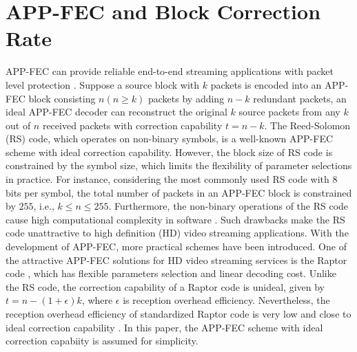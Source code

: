 \documentclass[journal]{IEEEtran}
\begin{document}
\section{APP-FEC and Block Correction Rate}
APP-FEC can provide reliable end-to-end streaming applications with packet level protection \cite{LuSW08}. Suppose a source block with $k$ packets is encoded into an APP-FEC block consisting $n \left(n\geq k\right)$ packets by adding $n-k$ redundant packets, an ideal APP-FEC decoder can reconstruct the original $k$ source packets from any $k$ out of $n$ received packets \cite{LuSW08} with correction capability $t=n-k$. The Reed-Solomon (RS) code, which operates on non-binary symbols, is a well-known APP-FEC scheme with ideal correction capability. However, the block size of RS code is constrained by the symbol size, which limits the flexibility of parameter selections in practice. For instance, considering the most commonly used RS code with $8$ bits per symbol, the total number of packets in an APP-FEC block is constrained by $255$, i.e., $k\leq n \leq 255$. Furthermore, the non-binary operations of the RS code cause high computational complexity in software \cite{LuSW08}. Such drawbacks make the RS code unattractive to high definition (HD) video streaming applications. With the development of APP-FEC, more practical schemes have been introduced. One of the attractive APP-FEC solutions for HD video streaming services is the Raptor code \cite{Shok06}, which has flexible parameters selection and linear decoding cost. Unlike the RS code, the correction capability of a Raptor code is unideal, given by $t=n-\left(1+\epsilon\right)k$, where $\epsilon$ is reception overhead efficiency. Nevertheless, the reception overhead efficiency of standardized Raptor code is very low and close to ideal correction capability \cite{LuSW08}. In this paper, the APP-FEC scheme with ideal correction capabiity is assumed for simplicity.
\end{document}
